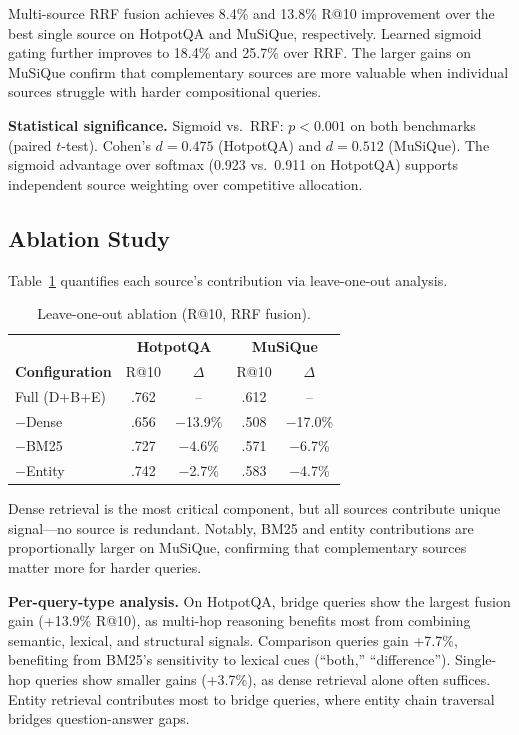 \documentclass[preprint,12pt]{elsarticle}
\begin{document}
Multi-source RRF fusion achieves 8.4\% and 13.8\% R@10 improvement over the best single source on HotpotQA and MuSiQue, respectively. Learned sigmoid gating further improves to 18.4\% and 25.7\% over RRF. The larger gains on MuSiQue confirm that complementary sources are more valuable when individual sources struggle with harder compositional queries.

\textbf{Statistical significance.} Sigmoid vs.\ RRF: $p<0.001$ on both benchmarks (paired $t$-test). Cohen's $d=0.475$ (HotpotQA) and $d=0.512$ (MuSiQue). The sigmoid advantage over softmax (0.923 vs.\ 0.911 on HotpotQA) supports independent source weighting over competitive allocation.

\subsection{Ablation Study}

Table~\ref{tab:ablation} quantifies each source's contribution via leave-one-out analysis.

\begin{table}[t]
\centering
\caption{Leave-one-out ablation (R@10, RRF fusion).}
\label{tab:ablation}
\begin{tabular}{lcccc}
\toprule
 & \multicolumn{2}{c}{\textbf{HotpotQA}} & \multicolumn{2}{c}{\textbf{MuSiQue}} \\
\textbf{Configuration} & R@10 & $\Delta$ & R@10 & $\Delta$ \\
\midrule
Full (D+B+E) & .762 & -- & .612 & -- \\
$-$Dense & .656 & $-$13.9\% & .508 & $-$17.0\% \\
$-$BM25 & .727 & $-$4.6\% & .571 & $-$6.7\% \\
$-$Entity & .742 & $-$2.7\% & .583 & $-$4.7\% \\
\bottomrule
\end{tabular}
\end{table}

Dense retrieval is the most critical component, but all sources contribute unique signal---no source is redundant. Notably, BM25 and entity contributions are proportionally larger on MuSiQue, confirming that complementary sources matter more for harder queries.

\textbf{Per-query-type analysis.} On HotpotQA, bridge queries show the largest fusion gain (+13.9\% R@10), as multi-hop reasoning benefits most from combining semantic, lexical, and structural signals. Comparison queries gain +7.7\%, benefiting from BM25's sensitivity to lexical cues (``both,'' ``difference''). Single-hop queries show smaller gains (+3.7\%), as dense retrieval alone often suffices. Entity retrieval contributes most to bridge queries, where entity chain traversal bridges question-answer gaps.
\end{document}
